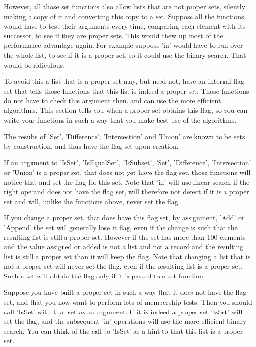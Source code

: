 However, all  those set functions  also allow lists that are  not  proper
sets,  silently making  a copy  of it and  converting this copy to a set.
Suppose all the functions would have to test  their arguments every time,
comparing  each element  with its  successor, to see if  they  are proper
sets.  This would chew up most  of  the performance advantage again.  For
example suppose 'in' would have to run  over the whole list, to see if it
is  a  proper set, so  it could  use the  binary search.   That  would be
ridiculous.

To avoid this a  list that is  a proper set  may, but need  not, have  an
internal flag set that tells  those functions that  this list is indeed a
proper set.  Those functions do not have to check this argument then, and
can use the more  efficient algorithms.  This  section tells  you  when a
proper set obtains this flag,  so you can write your  functions in such a
way that you make best use of the algorithms.

The results of 'Set', 'Difference', 'Intersection'  and 'Union' are known
to be sets by construction, and thus have the flag set upon creation.

If an argument to 'IsSet', 'IsEqualSet', 'IsSubset', 'Set', 'Difference',
'Intersection' or  'Union' is a proper  set, that does  not  yet have the
flag set, those functions will notice that and set the flag for this set.
Note that 'in' will use linear search if the  right operand does not have
the flag set, will therefore not detect  if it is  a proper set and will,
unlike the functions above, never set the flag.

If you change a proper set, that does have this  flag set, by assignment,
'Add'   or 'Append' the  set  will generally lose  it  flag,  even if the
change is such that the resulting list is still a proper set.  However if
the set has more than 100 elements and the value assigned or added is not
a list and not a record and the resulting list is still a proper set than
it will keep  the flag.  Note that  changing a list  that is not a proper
set will never set the flag, even if the resulting list  is a proper set.
Such a set will obtain the flag only if it is passed to a set function.

Suppose you have built a proper set  in such a way that  it does not have
the flag set, and that you now want  to perform lots of membership tests.
Then you  should call 'IsSet'  with that set   as an argument.   If it is
indeed  a proper set  'IsSet' will set the flag,  and the subsequent 'in'
operations will use  the more efficient binary  search.  You can think of
the call to 'IsSet' as a hint to {\GAP} that this list is a proper set.

